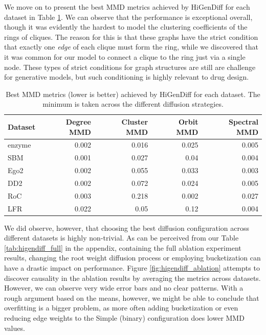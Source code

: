 We move on to present the best MMD metrics achieved by HiGenDiff for each dataset in Table \ref{tab:higendiff_best}. We can observe that the performance is exceptional overall, though it was evidently the hardest to model the clustering coefficients of the rings of cliques. The reason for this is that these graphs have the strict condition that exactly one \emph{edge} of each clique must form the ring, while we discovered that it was common for our model to connect a clique to the ring just via a single node. These types of strict conditions for graph structures are still are challenge for generative models, but such conditioning is highly relevant to drug design.

\begin{table}[H]
    \centering
        \caption[Best MMD metrics achieved by HiGenDiff for each dataset.]{Best MMD metrics (lower is better) achieved by HiGenDiff for each dataset. The minimum is taken across the different diffusion strategies.}
    \label{tab:higendiff_best}
\begin{tabular}{lrrrr}
\toprule
Dataset & Degree MMD & Cluster MMD & Orbit MMD & Spectral MMD \\
\midrule
enzyme & 0.002 & 0.016 & 0.025 & 0.005 \\
SBM & 0.001 & 0.027 & 0.04 & 0.004 \\
Ego2 & 0.002 & 0.055 & 0.033 & 0.003 \\
DD2 & 0.002 & 0.072 & 0.024 & 0.005 \\
RoC & 0.003 & 0.218 & 0.002 & 0.027 \\
LFR & 0.022 & 0.05 & 0.12 & 0.004 \\
\bottomrule
\end{tabular}
\end{table}

We did observe, however, that choosing the best diffusion configuration across different datasets is highly non-trivial. As can be perceived from our Table \ref{tab:higendiff_full} in the appendix, containing the full ablation experiment results, changing the root weight diffusion process or employing bucketization can have a drastic impact on performance. Figure \ref{fig:higendiff_ablation} attempts to discover causality in the ablation results by averaging the metrics across datasets. However, we can observe very wide error bars and no clear patterns. With a rough argument based on the means, however, we might be able to conclude that overfitting is a bigger problem, as more often adding bucketization or even reducing edge weights to the Simple (binary) configuration does lower MMD values.

